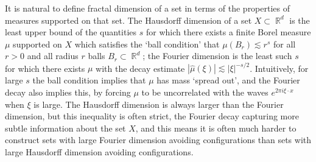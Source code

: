 \documentclass[11pt]{article}
\DeclareMathOperator{\RR}{\mathbb{R}}
\begin{document}

It is natural to define fractal dimension of a set in terms of the properties of measures supported on that set. The Hausdorff dimension of a set $X \subset \RR^d$ is the least upper bound of the quantities $s$ for which there exists a finite Borel measure $\mu$ supported on $X$ which satisfies the `ball condition' that $\mu(B_r) \lesssim r^s$ for all $r > 0$ and all radius $r$ balls $B_r \subset \RR^d$; the Fourier dimension is the least such $s$ for which there exists $\mu$ with the decay estimate $|\widehat{\mu}(\xi)| \lesssim |\xi|^{-s/2}$. Intuitively, for large $s$ the ball condition implies that $\mu$ has mass `spread out', and the Fourier decay also implies this, by forcing $\mu$ to be uncorrelated with the waves $e^{2 \pi i \xi \cdot x}$ when $\xi$ is large. The Hausdorff dimension is always larger than the Fourier dimension, but this inequality is often strict, the Fourier decay capturing more subtle information about the set $X$, and this means it is often much harder to construct sets with large Fourier dimension avoiding configurations than sets with large Hausdorff dimension avoiding configurations.
\end{document}
